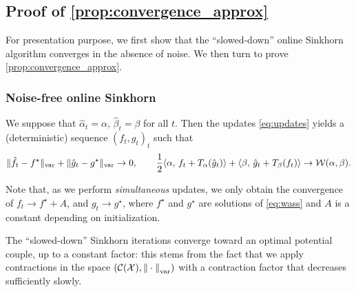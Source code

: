 \subsection{Proof of \autoref{prop:convergence_approx}}\label{sec:proof_convergence_approx}


For presentation purpose, we first show that the ``slowed-down'' online Sinkhorn algorithm converges in the absence of noise. We then turn to prove \autoref{prop:convergence_approx}.

\subsubsection{Noise-free online Sinkhorn}

\begin{proposition}\label{prop:deterministic}
    We suppose that $\hat \alpha_t = \alpha$, $\hat \beta_t = \beta$ for all
    $t$. Then the updates \eqref{eq:updates} yields a (deterministic) sequence $(f_t, g_t)_t$ such
    that 
    \begin{equation}
        \Vert \hat f_t - f^\star \Vert_{\text{var}} 
        + \Vert \hat g_t - g^\star \Vert_{\text{var}} \to 0,\qquad
        \frac{1}{2} \langle \alpha,\,f_t + T_{\alpha}(\hat g_t)\rangle + \langle \beta,\,\hat g_t + T_{\beta}(f_t)\rangle 
         \to \mathcal{W}(\alpha, \beta).
    \end{equation}
\end{proposition}
Note that, as we perform \textit{simultaneous} updates, we only obtain
the convergence of $f_t \to f^\star + A$, and $g_t \to g^\star$, where $f^\star$
and $g^\star$ are solutions of \eqref{eq:wass} and $A$ is a constant depending
on initialization.

The \enquote{slowed-down} Sinkhorn iterations converge toward an optimal
potential couple, up to a constant factor: this stems from the fact that we
apply contractions in the space $(\mathcal{C}(\mathcal{X}), {\Vert\cdot\Vert}_{\text{\upshape var}})$ with a
contraction factor that decreases sufficiently slowly.

